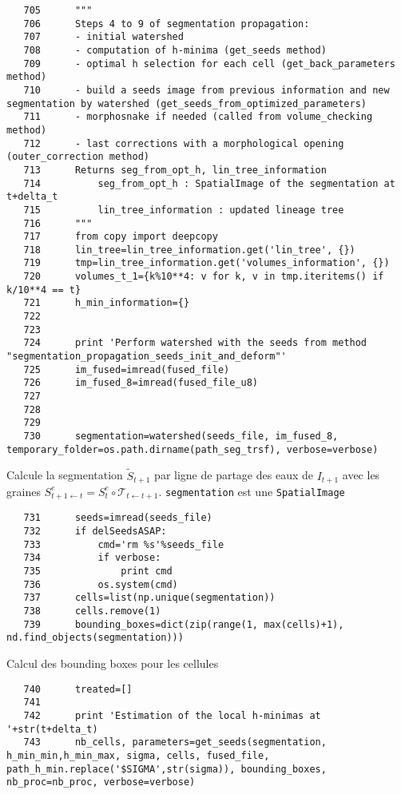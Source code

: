 \documentclass{article}
\def \mycolor {red}
\begin{document}
\begin{verbatim}  
   705	    """
   706	    Steps 4 to 9 of segmentation propagation:
   707	    - initial watershed
   708	    - computation of h-minima (get_seeds method)
   709	    - optimal h selection for each cell (get_back_parameters method)
   710	    - build a seeds image from previous information and new segmentation by watershed (get_seeds_from_optimized_parameters)
   711	    - morphosnake if needed (called from volume_checking method)
   712	    - last corrections with a morphological opening (outer_correction method)
   713	    Returns seg_from_opt_h, lin_tree_information
   714	        seg_from_opt_h : SpatialImage of the segmentation at t+delta_t
   715	        lin_tree_information : updated lineage tree 
   716	    """
   717	    from copy import deepcopy
   718	    lin_tree=lin_tree_information.get('lin_tree', {})
   719	    tmp=lin_tree_information.get('volumes_information', {})
   720	    volumes_t_1={k%10**4: v for k, v in tmp.iteritems() if k/10**4 == t}
   721	    h_min_information={}
   722	    
   723	
   724	    print 'Perform watershed with the seeds from method "segmentation_propagation_seeds_init_and_deform"'
   725	    im_fused=imread(fused_file)
   726	    im_fused_8=imread(fused_file_u8)
   727	
   728	
   729	
   730	    segmentation=watershed(seeds_file, im_fused_8, temporary_folder=os.path.dirname(path_seg_trsf), verbose=verbose)
\end{verbatim} 
\color{\mycolor}
Calcule la segmentation $\tilde{S}_{t+1}$ par ligne de partage des eaux de $I_{t+1}$ avec les graines $S^e_{t+1 \leftarrow t} = S^e_t \circ \mathcal{T}_{t \leftarrow t+1}$. \verb|segmentation| est une \texttt{SpatialImage}
\color{black}
\begin{verbatim}  
   731	    seeds=imread(seeds_file)
   732	    if delSeedsASAP:
   733	        cmd='rm %s'%seeds_file
   734	        if verbose:
   735	            print cmd
   736	        os.system(cmd)
   737	    cells=list(np.unique(segmentation))
   738	    cells.remove(1)
   739	    bounding_boxes=dict(zip(range(1, max(cells)+1), nd.find_objects(segmentation)))
\end{verbatim} 
\color{\mycolor}
Calcul des bounding boxes pour les cellules 
\color{black}
\begin{verbatim}  
   740	    treated=[]
   741	
   742	    print 'Estimation of the local h-minimas at '+str(t+delta_t)
   743	    nb_cells, parameters=get_seeds(segmentation, h_min_min,h_min_max, sigma, cells, fused_file, path_h_min.replace('$SIGMA',str(sigma)), bounding_boxes, nb_proc=nb_proc, verbose=verbose)
\end{verbatim} 
\end{document}
